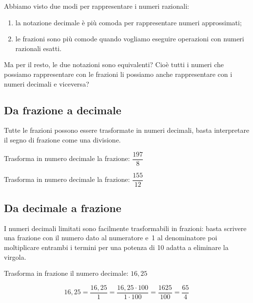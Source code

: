 Abbiamo visto due modi per rappresentare i numeri razionali:
\begin{enumerate}
 \item la notazione decimale è più comoda per rappresentare numeri 
approssimati;
 \item le frazioni sono più comode quando vogliamo eseguire operazioni con 
numeri razionali esatti.
\end{enumerate}

Ma per il resto, le due notazioni sono equivalenti? Cioè tutti i numeri che 
possiamo rappresentare con le frazioni li possiamo anche rappresentare con 
i numeri decimali e viceversa?

\subsection{Da frazione a decimale}

Tutte le frazioni possono essere trasformate in numeri decimali, basta 
interpretare il segno di frazione come una divisione.

\begin{esempio}
Trasforma in numero decimale la frazione: \(\dfrac{197}{8}\)
\begin{center}
 \begin{center}\end{center}
\end{center}
\end{esempio}

\begin{esempio}
Trasforma in numero decimale la frazione: \(\dfrac{155}{12}\)
\begin{center}
 \begin{center}\end{center}
\end{center}
\end{esempio}

\subsection{Da decimale a frazione}

I numeri decimali limitati sono facilmente trasformabili in frazioni: basta 
scrivere una frazione con il numero dato al numeratore e~1 al denominatore 
poi moltiplicare entrambi i termini per una potenza di 10 adatta a 
eliminare la virgola.

\begin{esempio}
Trasforma in frazione il numero decimale: \(16,25\)
\begin{center}
 \[16,25 = \frac{16,25}{1} = \frac{16,25 \cdot 100}{1 \cdot 100} =
   \frac{1625}{100} = \frac{65}{4}\]
\end{center}
\end{esempio}


